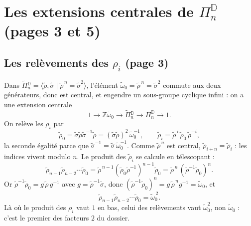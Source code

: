\documentclass[11pt,a4paper]{article}
\begin{document}
\section*{Les extensions centrales de $\Pi^{\mathbb{D}}_n$ (pages 3 et 5)}

\subsection*{Les relèvements des $\rho_i$ (page 3)}

Dans $\widetilde{\Pi}{}^{\mathbb{D}}_n = \langle \tilde\rho, \tilde\sigma \mid
\tilde\rho^{\,n} = \tilde\sigma^2 \rangle$, l'élément
$\tilde\omega_0 = \tilde\rho^{\,n} = \tilde\sigma^2$ commute aux deux générateurs,
donc est central, et engendre un sous-groupe cyclique infini : on a une extension
centrale
\[
1 \to \mathbb{Z}\tilde\omega_0 \to \widetilde{\Pi}{}^{\mathbb{D}}_n \to
\Pi^{\mathbb{D}}_n \to 1 .
\]
On relève les $\rho_i$ par
\[
\tilde\rho_0 = \tilde\sigma\tilde\rho\tilde\sigma^{-1}\tilde\rho
= (\tilde\sigma\tilde\rho)^2\,\tilde\omega_0^{-1}, \qquad
\tilde\rho_i = \tilde\rho^{\,i}\,\tilde\rho_0\,\tilde\rho^{-i} ,
\]
la seconde égalité parce que $\tilde\sigma^{-1} = \tilde\sigma\,\tilde\omega_0^{-1}$.
Comme $\tilde\rho^{\,n}$ est central, $\tilde\rho_{i+n} = \tilde\rho_i$ : les
indices vivent modulo $n$. Le produit des $\tilde\rho_i$ se calcule en
télescopant :
\[
\tilde\rho_{n-1}\tilde\rho_{n-2}\cdots\tilde\rho_0
= \tilde\rho^{\,n-1}(\tilde\rho_0\tilde\rho^{-1})^{n-1}\tilde\rho_0
= \tilde\rho^{\,n}\,(\tilde\rho^{-1}\tilde\rho_0)^n .
\]
Or $\tilde\rho^{-1}\tilde\rho_0 = g\,\tilde\rho\,g^{-1}$ avec
$g = \tilde\rho^{-1}\tilde\sigma$, donc $(\tilde\rho^{-1}\tilde\rho_0)^n =
g\,\tilde\rho^{\,n}g^{-1} = \tilde\omega_0$, et
\[
\boxed{\tilde\rho_{n-1}\tilde\rho_{n-2}\cdots\tilde\rho_0 = \tilde\omega_0^{\,2}} .
\]
Là où le produit des $\rho_i$ vaut $1$ en bas, celui des relèvements vaut
$\tilde\omega_0^2$, non $\tilde\omega_0$ : c'est le premier des facteurs $2$ du
dossier.
\end{document}
